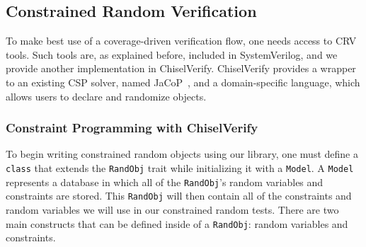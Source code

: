 \documentclass[conference]{IEEEtran}
\begin{document}


\subsection{Constrained Random Verification}

To make best use of a coverage-driven verification flow, one needs access to CRV tools. 
Such tools are, as explained before, included in SystemVerilog, and we provide another implementation in ChiselVerify. 
ChiselVerify provides a wrapper to an existing CSP solver, named JaCoP~\cite{jacop2013}, and a domain-specific language, which allows users to declare and randomize objects.

\subsubsection{Constraint Programming with ChiselVerify}
To begin writing constrained random objects using our library, one must define a \texttt{class} that extends the \texttt{RandObj} trait while initializing it with a \texttt{Model}. 
A \texttt{Model} represents a database in which all of the \texttt{RandObj}'s random variables and constraints are stored. 
This \texttt{RandObj} will then contain all of the constraints and random variables we will use in our constrained random tests. 
There are two main constructs that can be defined inside of a \texttt{RandObj}: random variables and constraints.
\end{document}
